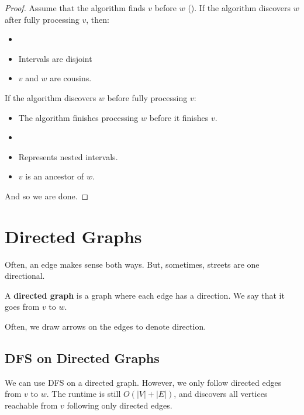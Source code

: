 \documentclass[letterpaper]{article}
\begin{document}
\begin{mdframed}[]
    \begin{proof}
        Assume that the algorithm finds $v$ before $w$ (). If the algorithm discovers $w$ after fully processing $v$, then: 
        \begin{itemize}
            \item {}
            \item Intervals are disjoint 
            \item $v$ and $w$ are cousins.
        \end{itemize}
        If the algorithm discovers $w$ before fully processing $v$:
        \begin{itemize}
            \item The algorithm finishes processing $w$ before it finishes $v$.
            \item {}
            \item Represents nested intervals. 
            \item $v$ is an ancestor of $w$. 
        \end{itemize}
        And so we are done.
    \end{proof}
\end{mdframed}

\section{Directed Graphs}
Often, an edge makes sense both ways. But, sometimes, streets are one directional.
\begin{definition}{}{}
    A \textbf{directed graph} is a graph where each edge has a direction. We say that it goes from $v$ to $w$. 
\end{definition}
Often, we draw arrows on the edges to denote direction. 

\subsection{DFS on Directed Graphs}
We can use DFS on a directed graph. However, we only follow directed edges from $v$ to $w$. The runtime is still $O(|V| + |E|)$, and  discovers all vertices reachable from $v$ following only directed edges. 
\end{document}
